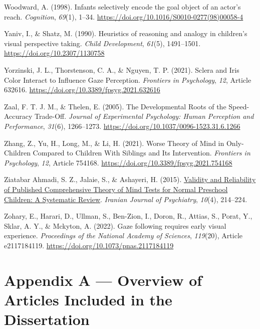 \documentclass[
]{scrbook}
\newlength{\cslhangindent}
\newenvironment{CSLReferences}[2] %
 {\begin{list}{}{%
  \setlength{\itemindent}{0pt}
  \setlength{\leftmargin}{0pt}
  \setlength{\parsep}{0pt}
  \ifodd #1
   \setlength{\leftmargin}{\cslhangindent}
   \setlength{\itemindent}{-1\cslhangindent}
  \fi
  \setlength{\itemsep}{#2\baselineskip}}}
 {\end{list}}
\begin{document}
\begin{CSLReferences}{1}{0}
Woodward, A. (1998). Infants selectively encode the goal object of an actor's reach. \emph{Cognition}, \emph{69}(1), 1--34. \url{https://doi.org/10.1016/S0010-0277(98)00058-4}

Yaniv, I., \& Shatz, M. (1990). Heuristics of reasoning and analogy in children's visual perspective taking. \emph{Child Development}, \emph{61}(5), 1491--1501. \url{https://doi.org/10.2307/1130758}

Yorzinski, J. L., Thorstenson, C. A., \& Nguyen, T. P. (2021). Sclera and {Iris Color Interact} to {Influence Gaze Perception}. \emph{Frontiers in Psychology}, \emph{12}, Article 632616. \url{https://doi.org/10.3389/fpsyg.2021.632616}

Zaal, F. T. J. M., \& Thelen, E. (2005). The {Developmental Roots} of the {Speed-Accuracy Trade-Off}. \emph{Journal of Experimental Psychology: Human Perception and Performance}, \emph{31}(6), 1266--1273. \url{https://doi.org/10.1037/0096-1523.31.6.1266}

Zhang, Z., Yu, H., Long, M., \& Li, H. (2021). Worse {Theory} of {Mind} in {Only-Children Compared} to {Children With Siblings} and {Its Intervention}. \emph{Frontiers in Psychology}, \emph{12}, Article 754168. \url{https://doi.org/10.3389/fpsyg.2021.754168}

Ziatabar Ahmadi, S. Z., Jalaie, S., \& Ashayeri, H. (2015). \href{https://www.ncbi.nlm.nih.gov/pmc/articles/PMC4801491}{Validity and {Reliability} of {Published Comprehensive Theory} of {Mind Tests} for {Normal Preschool Children}: {A Systematic Review}}. \emph{Iranian Journal of Psychiatry}, \emph{10}(4), 214--224.

Zohary, E., Harari, D., Ullman, S., Ben-Zion, I., Doron, R., Attias, S., Porat, Y., Sklar, A. Y., \& Mckyton, A. (2022). Gaze following requires early visual experience. \emph{Proceedings of the National Academy of Sciences}, \emph{119}(20), Article e2117184119. \url{https://doi.org/10.1073/pnas.2117184119}

\end{CSLReferences}

\chapter{Appendix A --- Overview of Articles Included in the Dissertation}\label{appendixA}
\end{document}

